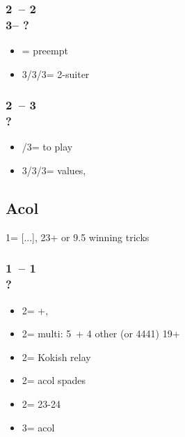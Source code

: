 \documentclass[12pt, a4paper]{report}
\begin{document}
\begin{bidpage}
\subsubsection*{2\clubs\ -- 2\nt\\
                3\clubs -- ?}
\begin{itemize}
    \item \pass = \clubs preempt
    \item 3\diams/3\hearts/3\spades = 2-suiter \qq
\end{itemize}
\end{bidpage}

\begin{bidpage}
\subsubsection*{2\clubs\ -- 3\clubs\\
                ?}
\begin{itemize}
    \item \pass/3\nt = to play
    \item 3\diams/3\hearts/3\spades = values, \fton{4\clubs}
\end{itemize}
\end{bidpage}

\begin{bidpage}
\section{Acol}

1\clubs = [...], 23+ \hcp or 9.5 winning tricks

\subsubsection*{1\clubs\ -- 1\diams\\
                ?}
\begin{itemize}
    \item 2\clubs = +, \nf
    \item 2\diams = multi: 5\clubs\ + 4 other (or 4441) 19+
    \item 2\hearts = Kokish relay
    \item 2\spades = acol spades
    \item 2\nt = 23-24 \bal
    \item 3\clubs = acol \diams
\end{itemize}
\end{bidpage}
\end{document}
